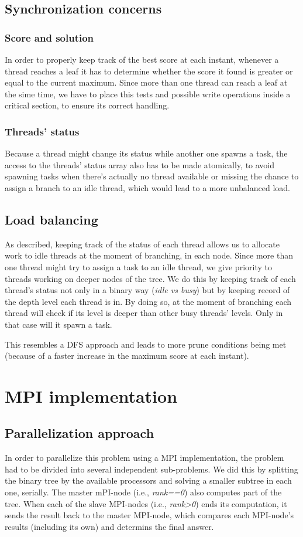 \documentclass[paper=a4, fontsize=11pt]{scrartcl} %
\numberwithin{equation}{section} %
\numberwithin{figure}{section} %
\numberwithin{table}{section} %
\begin{document}
\subsection{Synchronization concerns}
\subsubsection{Score and solution}
In order to properly keep track of the best score at each instant, whenever a thread reaches a leaf it has to determine whether
the score it found is greater or equal to the current maximum. Since more than one thread can reach a leaf at the sime time, we
have to place this tests and possible write operations inside a critical section, to ensure its correct handling.
\subsubsection{Threads' status}
Because a thread might change its status while another one spawns a task, the access to the threads' status array also has to be
made atomically, to avoid spawning tasks when there's actually no thread available or missing the chance to assign a branch to an
idle thread, which would lead to a more unbalanced load.
\subsection{Load balancing}
As described, keeping track of the status of each thread allows us to allocate work to idle threads at the moment of branching,
in each node. Since more than one thread might try to assign a task to an idle thread, we give priority to threads working on
deeper nodes of the tree. We do this by keeping track of each thread's status not only in a binary way (\emph{idle vs busy}) but
by keeping record of the depth level each thread is in. By doing so, at the moment of branching each thread will check if its
level is deeper than other busy threads' levels. Only in that case will it spawn a task.

This resembles a DFS approach and leads to more prune conditions being met (because of a faster increase in the maximum
score at each instant).
\section{MPI implementation}
\subsection{Parallelization approach}
In order to parallelize this problem using a MPI implementation, the problem had to be divided into several independent
sub-problems. We did this by splitting the binary tree by the available processors and solving a smaller subtree in each one,
serially. The master mPI-node (i.e., \emph{rank==0}) also computes part of the tree. When each of the slave MPI-nodes (i.e., \emph{rank>0})
ends its computation, it sends the result back to the master MPI-node, which compares each MPI-node's results (including its own) and
determins the final answer.
\end{document}
